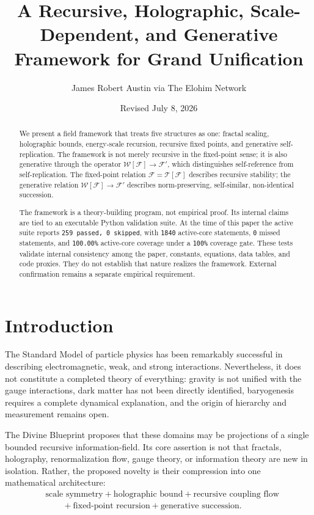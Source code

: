 \documentclass[12pt]{article}
\title{A Recursive, Holographic, Scale-Dependent, and Generative Framework for Grand Unification}
\author{James Robert Austin via The Elohim Network}
\date{Revised July 8, 2026}
\theoremstyle{remark}
\newcommand{\F}{\mathcal{F}}
\newcommand{\T}{\mathcal{T}}
\newcommand{\W}{\mathcal{W}}
\begin{document}
\maketitle

\begin{abstract}
We present a field framework that treats five structures as one: fractal
scaling, holographic bounds, energy-scale recursion, recursive fixed points,
and generative self-replication.  The framework is not merely recursive in the
fixed-point sense; it is also generative through the operator $\W[\F]\to\F'$,
which distinguishes self-reference from self-replication.  The fixed-point
relation $\F=\T[\F]$ describes recursive stability; the generative relation
$\W[\F]\to \F'$ describes norm-preserving, self-similar, non-identical
succession.

The framework is a theory-building program, not empirical proof.  Its internal
claims are tied to an executable Python validation suite.  At the time of this
paper the active suite reports \texttt{259 passed, 0 skipped}, with
\texttt{1840} active-core statements, \texttt{0} missed statements, and
\texttt{100.00\%} active-core coverage under a \texttt{100\%} coverage gate.
These tests validate internal consistency among the paper, constants, equations,
data tables, and code proxies.  They do not establish that nature realizes the
framework.  External confirmation remains a separate empirical requirement.
\end{abstract}

\section{Introduction}

The Standard Model of particle physics has been remarkably successful in
describing electromagnetic, weak, and strong interactions.  Nevertheless, it does
not constitute a completed theory of everything: gravity is not unified with the
gauge interactions, dark matter has not been directly identified, baryogenesis
requires a complete dynamical explanation, and the origin of hierarchy and
measurement remains open.

The Divine Blueprint proposes that these domains may be projections of a single
bounded recursive information-field.  Its core assertion is not that fractals,
holography, renormalization flow, gauge theory, or information theory are new in
isolation.  Rather, the proposed novelty is their compression into one
mathematical architecture:
\begin{align}
  &\text{scale symmetry}
  + \text{holographic bound}
  + \text{recursive coupling flow}
  \nonumber\\
  &\qquad
  + \text{fixed-point recursion}
  + \text{generative succession}.
\end{align}
\end{document}
